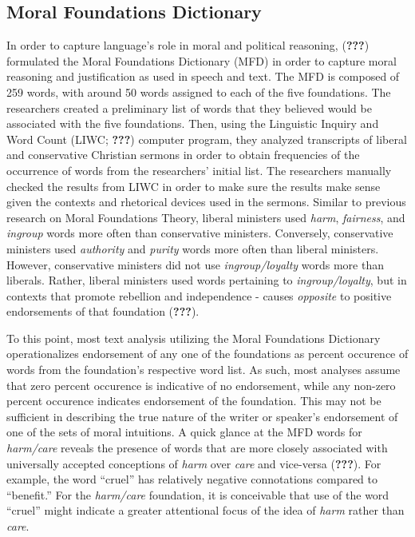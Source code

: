 \documentclass[,man]{apa6}
\theoremstyle{definition}
\theoremstyle{definition}
\theoremstyle{definition}
\theoremstyle{remark}
\begin{document}
\hypertarget{moral-foundations-dictionary}{%
\subsection{Moral Foundations
Dictionary}\label{moral-foundations-dictionary}}

In order to capture language's role in moral and political reasoning,
({\textbf{???}}) formulated the Moral Foundations Dictionary (MFD) in
order to capture moral reasoning and justification as used in speech and
text. The MFD is composed of 259 words, with around 50 words assigned to
each of the five foundations. The researchers created a preliminary list
of words that they believed would be associated with the five
foundations. Then, using the Linguistic Inquiry and Word Count (LIWC;
{\textbf{???}}) computer program, they analyzed transcripts of liberal
and conservative Christian sermons in order to obtain frequencies of the
occurrence of words from the researchers' initial list. The researchers
manually checked the results from LIWC in order to make sure the results
make sense given the contexts and rhetorical devices used in the
sermons. Similar to previous research on Moral Foundations Theory,
liberal ministers used \emph{harm}, \emph{fairness}, and \emph{ingroup}
words more often than conservative ministers. Conversely, conservative
ministers used \emph{authority} and \emph{purity} words more often than
liberal ministers. However, conservative ministers did not use
\emph{ingroup/loyalty} words more than liberals. Rather, liberal
ministers used words pertaining to \emph{ingroup/loyalty}, but in
contexts that promote rebellion and independence - causes
\emph{opposite} to positive endorsements of that foundation
({\textbf{???}}).

To this point, most text analysis utilizing the Moral Foundations
Dictionary operationalizes endorsement of any one of the foundations as
percent occurence of words from the foundation's respective word list.
As such, most analyses assume that zero percent occurence is indicative
of no endorsement, while any non-zero percent occurence indicates
endorsement of the foundation. This may not be sufficient in describing
the true nature of the writer or speaker's endorsement of one of the
sets of moral intuitions. A quick glance at the MFD words for
\emph{harm/care} reveals the presence of words that are more closely
associated with universally accepted conceptions of \emph{harm} over
\emph{care} and vice-versa ({\textbf{???}}). For example, the word
\enquote{cruel} has relatively negative connotations compared to
\enquote{benefit.} For the \emph{harm/care} foundation, it is
conceivable that use of the word \enquote{cruel} might indicate a
greater attentional focus of the idea of \emph{harm} rather than
\emph{care}.
\end{document}

